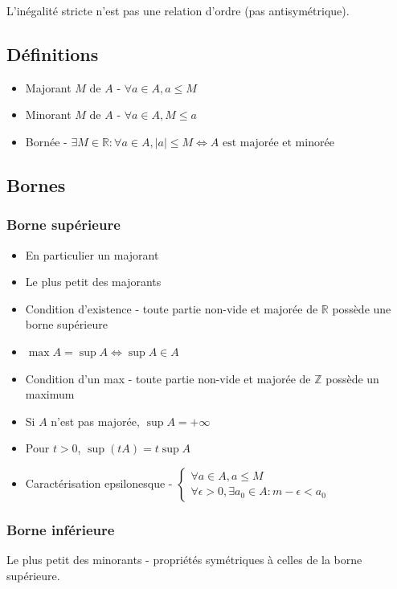 \documentclass[openany]{book}
\begin{document}
L'inégalité stricte n'est pas une relation d'ordre (pas antisymétrique).

\subsection{Définitions}
\begin{itemize}
    \item Majorant $M$ de $A$ - $ \forall a \in A, a \leq M $
    \item Minorant $M$ de $A$ - $ \forall a \in A, M \leq a $
    \item Bornée - $ \exists M \in \mathbb{R} : \forall a \in A, |a| \leq M \iff A \text{ est majorée et minorée} $
\end{itemize}

\subsection{Bornes}
\subsubsection{Borne supérieure}
\begin{itemize}
    \item En particulier un majorant
    \item Le plus petit des majorants
    \item Condition d'existence - toute partie non-vide et majorée de $\mathbb{R}$ possède une borne supérieure
    \item $\max{A} = \sup{A} \iff \sup{A} \in A $
    \item Condition d'un max - toute partie non-vide et majorée de $\mathbb{Z}$ possède un maximum
    \item Si $A$ n'est pas majorée, $\sup{A} = +\infty$
    \item Pour $t>0$, $\sup (tA) = t \sup A$
    \item Caractérisation epsilonesque - $ \begin{cases}
        \forall a \in A, a \leq M \\
        \forall \epsilon > 0, \exists a_0 \in A : m - \epsilon < a_0
    \end{cases} $
\end{itemize}
\subsubsection{Borne inférieure} 

Le plus petit des minorants - propriétés symétriques à celles de la borne supérieure.
\end{document}
